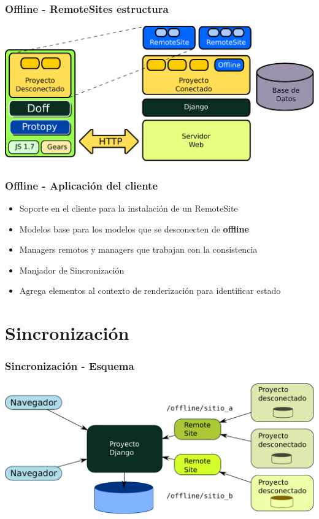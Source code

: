 \documentclass{beamer}
\begin{document}
\begin{frame}

    \frametitle{Offline - RemoteSites estructura}
    \includegraphics[scale=0.5]{remote_sites.pdf}
    
\end{frame}

\begin{frame}
    \frametitle{Offline - Aplicación del cliente}
    \begin{itemize}
      \item{Soporte en el cliente para la instalación de un RemoteSite}
      \item{Modelos base para los modelos que se desconecten de {\bf offline}}
      \item{Managers remotos y managers que trabajan con la consistencia}
      \item{Manjador de Sincronización}
      \item{Agrega elementos al contexto de renderización para identificar
            estado}
    \end{itemize}
\end{frame}

\section{Sincronización}
\begin{frame}
    \frametitle{Sincronización - Esquema}
    \includegraphics[scale=0.5]{esquema_distribuido.pdf}
\end{frame}
\end{document}
